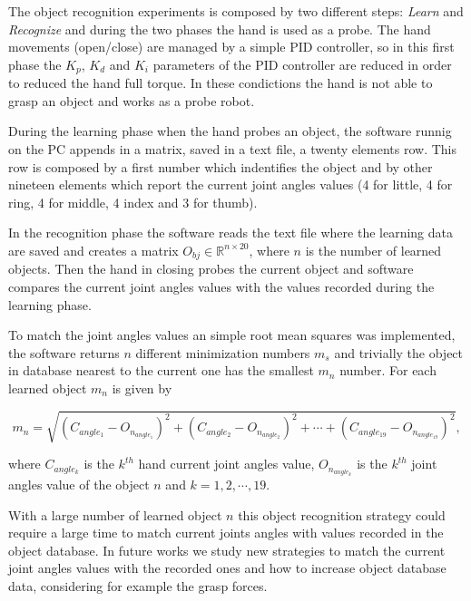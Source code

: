 The object recognition experiments is composed by two different steps: \textit{Learn} and \textit{Recognize} and during the two phases the hand is used as a probe. 
The hand movements (open/close) are managed by a simple PID controller, so in this first phase the $K_p$, $K_d$ and $K_i$ parameters of the PID controller are reduced in order to reduced the hand full torque. In these condictions the hand is not able to grasp an object and works as a probe robot. 

During the learning phase when the hand probes an object, the software runnig on the PC appends in a matrix, saved in a text file, a twenty elements row. This row is composed by a first number which indentifies the object and by other nineteen elements which report the current joint angles values (4 for little, 4 for ring, 4 for middle, 4 index and 3 for thumb). 

In the recognition phase the software reads the text file where the learning data are saved and creates a matrix $O_{bj} \in \mathbb{R}^{n \times 20}$, where $n$ is the number of learned objects.
Then the hand in closing probes the current object and software compares the current joint angles values with the values recorded during the learning phase. 

To match the joint angles values an simple root mean squares was implemented, the software returns $n$ different minimization numbers $m_s$ and trivially the object in database nearest to the current one has the smallest $m_n$ number. 
For each learned object $m_n$ is given by

\begin{equation}
m_n = \sqrt{(C_{angle_{1}} - O_{n_{angle_{1}}})^2 + (C_{angle_{2}} - O_{n_{angle_{2}}})^2 + \cdots + (C_{angle_{19}} - O_{n_{angle_{19}}})^2 },
\end{equation}
       
\noindent where $C_{angle_{k}}$ is the $k^{th}$ hand current joint angles value, $O_{n_{angle_{k}}}$ is the $k^{th}$ joint angles value of the object $n$ and $k=1, 2 , \cdots , 19$.
   
With a large number of learned object $n$ this object recognition strategy could require a large time to match current joints angles with values recorded in the object database. In future works we study new strategies to match the current joint angles values with the recorded ones and how to increase object database data, considering for example the grasp forces.

